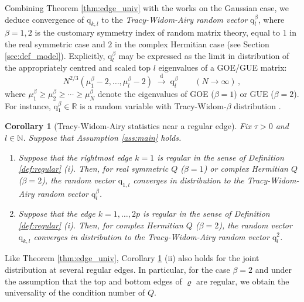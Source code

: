 \documentclass[11pt]{article} %
\newcommand{\nc}{\normalcolor}
\numberwithin{equation}{section}
\numberwithin{figure}{section}
\theoremstyle{plain} %
\newtheorem{corollary}[theorem]{Corollary}
\theoremstyle{definition} %
\newcommand{\f}[1]{\boldsymbol{\mathrm{#1}}} %
\newcommand{\R}{\mathbb{R}}
\newcommand{\N}{\mathbb{N}}
\newcommand{\todist}{\overset{\text{d}}{\longrightarrow}}
\renewcommand{\geq}{\geqslant}
\begin{document}
Combining Theorem \ref{thm:edge_univ} with the works \cite{HHN, ElK2, Ona, SL} on the Gaussian case, we deduce convergence of $\f q_{k,l}$ to the \emph{Tracy-Widom-Airy random vector} $\f q_l^\beta$, where $\beta = 1,2$ is the customary symmetry index of random matrix theory, equal to $1$ in the real symmetric case and $2$ in the complex Hermitian case   (see Section \ref{sec:def_model}). \nc Explicitly, $\f q_l^\beta$ may be expressed as the limit in distribution of the appropriately centred and scaled top $l$ eigenvalues of a GOE/GUE matrix:
\begin{equation*}
N^{2/3} (\mu^\beta_1 - 2, \dots, \mu^\beta_l - 2) \;\todist\; {\f q}_l^\beta \qquad (N \to \infty)\,,
\end{equation*}
where $\mu^\beta_1 \geq \mu^\beta_2 \geq \cdots \geq \mu^\beta_N$ denote the eigenvalues of GOE ($\beta = 1$) or GUE ($\beta = 2$). For instance, $\f q_1^\beta \in \R$ is a random variable with Tracy-Widom-$\beta$ distribution \cite{TW1,TW2}.

\begin{corollary}[Tracy-Widom-Airy statistics near a regular edge] \label{cor:TWA}
Fix $\tau > 0$ and $l \in \N$. Suppose that Assumption \ref{ass:main} holds.
\begin{enumerate}
\item
Suppose that the rightmost edge $k = 1$ is regular in the sense of Definition \ref{def:regular} (i).
Then, for real symmetric $Q$ ($\beta = 1$) or complex Hermitian $Q$ ($\beta = 2$), the random vector $\f q_{1,l}$ converges in distribution to the Tracy-Widom-Airy random vector $\f q_l^\beta$.
\item
Suppose that the edge $k = 1, \dots, 2p$ is regular in the sense of Definition \ref{def:regular} (i). Then, for complex Hermitian $Q$ ($\beta = 2$), the random vector $\f q_{k,l}$ converges in distribution to the Tracy-Widom-Airy random vector $\f q_l^2$.
\end{enumerate}
\end{corollary}


Like Theorem \ref{thm:edge_univ}, Corollary \ref{cor:TWA} (ii) also holds for the joint distribution at several regular edges. In particular, for the case $\beta = 2$ and under the assumption that the top and bottom edges of $\varrho$ are regular, we obtain the universality of the condition number of $Q$.
\end{document}
